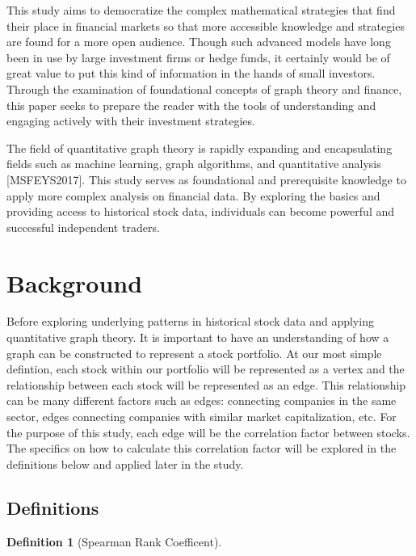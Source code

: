 \documentclass{article}
\newtheorem{definition}[theorem]{Definition}
\begin{document}
This study aims to democratize the complex mathematical strategies that find their place in financial markets so that more accessible knowledge and strategies are found for a more open audience. Though such advanced models have long been in use by large investment firms or hedge funds, it certainly would be of great value to put this kind of information in the hands of small investors. Through the examination of foundational concepts of graph theory and finance, this paper seeks to prepare the reader with the tools of understanding and engaging actively with their investment strategies.

The field of quantitative graph theory is rapidly expanding and encapsulating fields such as machine learning, graph algorithms, and quantitative analysis [MSFEYS2017]. This study serves as foundational and prerequisite knowledge to apply more complex analysis on financial data. By exploring the basics and providing  access to historical stock data, individuals can become powerful and successful independent traders.


\section{Background}

Before exploring underlying patterns in historical stock data and applying quantitative graph theory. It is important to have an understanding of how a graph can be constructed to represent a stock portfolio. At our most simple defintion, each stock within our portfolio will be represented as a vertex and the relationship between each stock will be represented as an edge. This relationship can be many different factors such as edges: connecting companies in the same sector, edges connecting companies with similar market capitalization, etc. For the purpose of this study, each edge will be the correlation factor between stocks. The specifics on how to calculate this correlation factor will be explored in the definitions below and applied later in the study.

\subsection{Definitions}

\begin{definition}[Spearman Rank Coefficent]
\end{definition}
\end{document}
